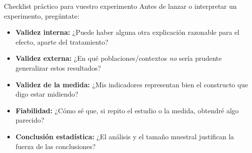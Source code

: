 ﻿\documentclass{beamer}
\begin{document}
\begin{frame}{Checklist práctico para vuestro experimento}
    Antes de lanzar o interpretar un experimento, pregúntate:
    \begin{itemize}
        \item \textbf{Validez interna:} ¿Puede haber alguna otra explicación razonable para el efecto, aparte del tratamiento?
        \item \textbf{Validez externa:} ¿En qué poblaciones/contextos \emph{no} sería prudente generalizar estos resultados?
        \item \textbf{Validez de la medida:} ¿Mis indicadores representan bien el constructo que digo estar midiendo?
        \item \textbf{Fiabilidad:} ¿Cómo sé que, si repito el estudio o la medida, obtendré algo parecido?
        \item \textbf{Conclusión estadística:} ¿El análisis y el tamaño muestral justifican la fuerza de las conclusiones?
    \end{itemize}
\end{frame}
\end{document}

